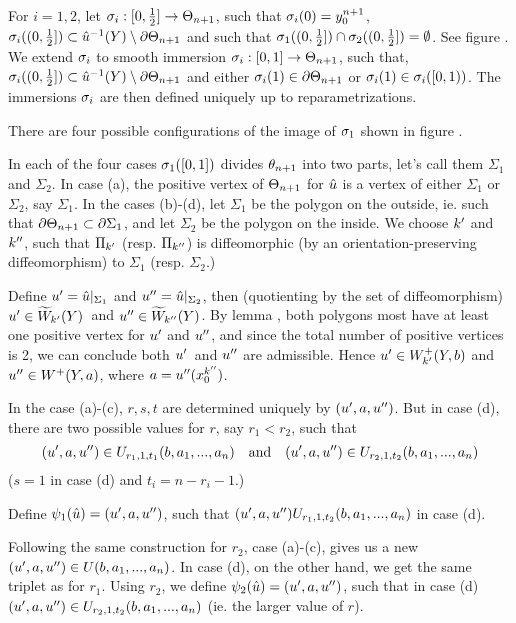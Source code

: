 For $i=1,2$, let $\sigma_i : [0,\frac{1}{2}] \to \Theta_{n+1}$, such that
$\sigma_i(0) = y^{n+1}_0$, $\sigma_i((0,\frac{1}{2}]) \subset \hat{u}^{-1}(Y) \setminus \partial
\Theta_{n+1}$ and such that $\sigma_1((0,\frac{1}{2}]) \cap \sigma_2((0,\frac{1}{2}]) = \emptyset$.
See figure . We extend $\sigma_i$ to smooth immersion $\sigma_i : [0,1] \to \Theta_{n+1}$, such that, 
$\sigma_i((0,\frac{1}{2}]) \subset \hat{u}^{-1}(Y) \setminus \partial \Theta_{n+1}$ and either
$\sigma_i(1) \in \partial \Theta_{n+1}$ or $\sigma_i(1) \in \sigma_i([0,1))$.
The immersions $\sigma_i$ are then defined uniquely up to reparametrizations. 

There are four possible configurations of the image of $\sigma_1$ shown in figure
. 

In each of the four cases $\sigma_1([0,1])$ divides $\theta_{n+1}$ into two parts,
let's call them $\Sigma_1$ and $\Sigma_2$. In case (a), the positive vertex of
$\Theta_{n+1}$ for $\hat{u}$ is a vertex of either $\Sigma_1$ or $\Sigma_2$, say
$\Sigma_1$.  
In the cases (b)-(d), let $\Sigma_1$ be the polygon on the outside, ie. such
that $\partial \Theta_{n+1} \subset \partial \Sigma_1$, and let $\Sigma_2$ be the
polygon on the inside. We choose ${k'}$ and ${k''}$, such that $\Pi_{k'}$ (resp.
$\Pi_{k''}$) is diffeomorphic (by an orientation-preserving diffeomorphism) to
$\Sigma_1$ (resp. $\Sigma_2$.) 

Define ${u'} = \hat{u}|_{\Sigma_1}$ and ${u''} = \hat{u}|_{\Sigma_2}$, then 
(quotienting by the set of diffeomorphism) ${u'} \in \widetilde{W}_{k'}(Y)$ and ${u''}
\in \widetilde{W}_{k''}(Y)$. By lemma , both polygons most have at
least one positive vertex for ${u'}$ and ${u''}$, and since the total number of
positive vertices is 2, we can conclude both ${u'}$ and ${u''}$ are admissible. 
Hence ${u'} \in W^+_{k'}(Y,b)$ and ${u''} \in W^+(Y,a)$, where $a =
{u''}(x^{k''}_0)$.

In the case (a)-(c), $r,s,t$ are determined uniquely by $({u'},a,{u''})$. But in
case (d), there are two possible values for $r$, say $r_1 < r_2$, such that
\[  ({u'}, a, {u''}) \in U_{r_1,1,t_1}(b,a_1,...,a_n) \quad\text{and}\quad ({u'}, a, {u''}) \in
U_{r_2,1,t_2}(b,a_1,...,a_n) \] 
($s=1$ in case (d) and $t_i = n - r_i - 1$.)

Define $\psi_1(\hat{u}) = ({u'},a,{u''})$, such that $({u'},a,{u''})
U_{r_1,1,t_2}(b,a_1,...,a_n)$ in case (d). 

Following the same construction for $r_2$, case (a)-(c), gives us a new 
$({u'},a,{u''}) \in U(b,a_1,...,a_n)$. In case (d), on the other hand, we get the
same triplet as for $r_1$. Using $r_2$, we define $\psi_2(\hat{u}) = ({u'}, a,
{u''})$, such that in case (d) $({u'},a,{u''}) \in U_{r_2,1,t_2}(b,a_1,...,a_n)$
(ie. the larger value of $r$).

